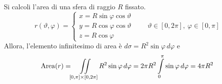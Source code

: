  \begin{example}
     Si calcoli l'area di una sfera di raggio $R$ fissato.
     \begin{equation*}
         r(\vartheta, \varphi)=\begin{cases}
             x= R \sin \varphi \cos \vartheta\\
             y= R \cos \varphi \cos \vartheta\\
             z=R \cos \varphi
         \end{cases}
         \qquad \vartheta \in [0, 2\pi],\ \varphi \in [0, \pi]
     \end{equation*}
     Allora, l'elemento infinitesimo di area è $d\sigma= R^2 \sin \varphi\, d\varphi$ e 
     \begin{equation*}
         \operatorname{Area}(r)= \iint\limits_{[0, \pi] \times [0, 2\pi]}{R^2 \sin \varphi}\, d\varphi= 2\pi R^2 \int\limits_{0}^{\pi}{\sin \varphi}\, d\varphi = 4\pi R^2
     \end{equation*}
 \end{example}
